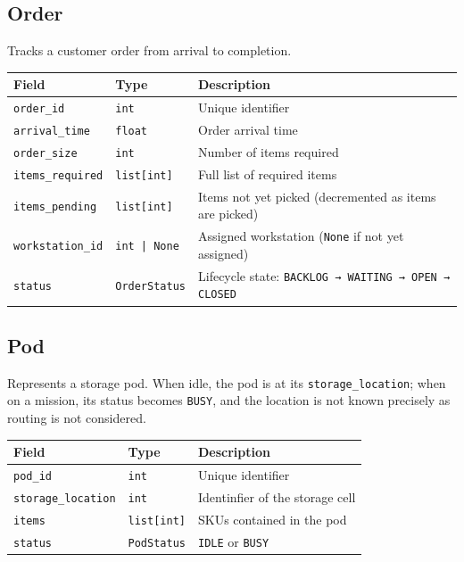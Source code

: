 \documentclass[a4paper,10pt]{article}
\begin{document}
\subsection{Order}

Tracks a customer order from arrival to completion. 

\vspace{0.4em}
\begin{tabularx}{\textwidth}{l l X}
\toprule
\textbf{Field} & \textbf{Type} & \textbf{Description} \\
\midrule
\texttt{order\_id}       & \texttt{int}         & Unique identifier \\
\texttt{arrival\_time}   & \texttt{float}       & Order arrival time \\
\texttt{order\_size}     & \texttt{int}         & Number of items required \\
\texttt{items\_required} & \texttt{list[int]}   & Full list of required items \\
\texttt{items\_pending}  & \texttt{list[int]}   & Items not yet picked (decremented as items are picked)\\
\texttt{workstation\_id} & \texttt{int | None}  & Assigned workstation (\texttt{None} if not yet assigned) \\
\texttt{status}          & \texttt{OrderStatus} & Lifecycle state: \texttt{BACKLOG → WAITING → OPEN → CLOSED} \\
\bottomrule
\end{tabularx}

\subsection{Pod}

Represents a storage pod. When idle, the pod is at its \texttt{storage\_location}; when on a mission, its status becomes \texttt{BUSY}, and the location is not known precisely as routing is not considered.

\vspace{0.4em}
\begin{tabularx}{\textwidth}{l l X}
\toprule
\textbf{Field} & \textbf{Type} & \textbf{Description} \\
\midrule
\texttt{pod\_id}           & \texttt{int}            & Unique identifier \\
\texttt{storage\_location} & \texttt{int}            & Identinfier of the storage cell \\
\texttt{items}             & \texttt{list[int]}      & SKUs contained in the pod \\
\texttt{status}            & \texttt{PodStatus}      & \texttt{IDLE} or \texttt{BUSY} \\
\bottomrule
\end{tabularx}
\end{document}
